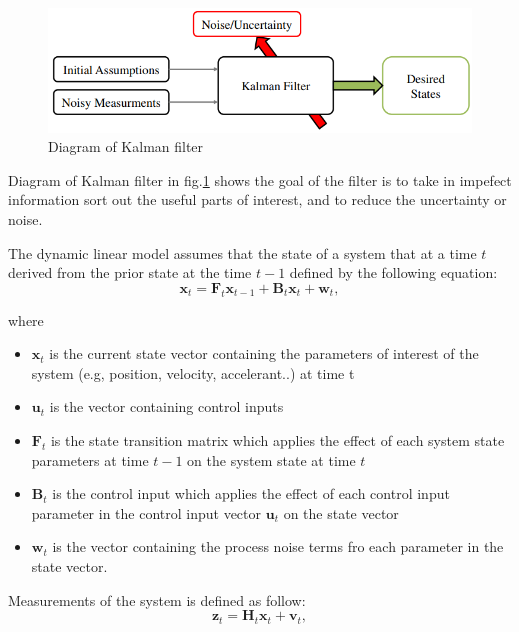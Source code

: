 \begin{figure}[h!]
        \centering
        \includegraphics[width=\textwidth]{Chapters/Fig/kalman_dig.png}
        \caption{Diagram of Kalman filter}
        \label{fig:kalman_dig}
\end{figure}\par
Diagram of Kalman filter in fig.\ref{fig:kalman_dig}\cite{Kalman} shows the goal of the filter is to take in impefect 
information sort out the useful parts of interest, and to reduce the uncertainty or noise.\par
The dynamic linear model assumes that the state of a system that at a time $t$ derived from the prior state at the time $t-1$ 
defined by the following equation:
\begin{equation}
    \textbf{x}_t = \textbf{F}_t \textbf{x}_{t-1} + \textbf{B}_t \textbf{x}_t + \textbf{w}_t,
   \end{equation}\par
   where
   \begin{itemize}
       \item $\textbf{x}_t$ is the current state vector containing the parameters of interest of the system (e.g, position, velocity, accelerant..) at time t
       \item $\textbf{u}_t$ is the vector containing control inputs
       \item $\textbf{F}_t$ is the state transition matrix which applies the effect of each system state parameters at time $t-1$ on the system state at time $t$
       \item $\textbf{B}_t$ is the control input which applies the effect of each control input parameter in the control input vector $\textbf{u}_t$ on the state vector
       \item $\textbf{w}_t$ is the vector containing the process noise terms fro each parameter in the state vector.
   \end{itemize}
   
   \hspace{0.45cm}Measurements of the system is defined as follow:
   \begin{equation}
            \textbf{z}_t = \textbf{H}_t\textbf{x}_t + \textbf{v}_t,
   \end{equation}
   
